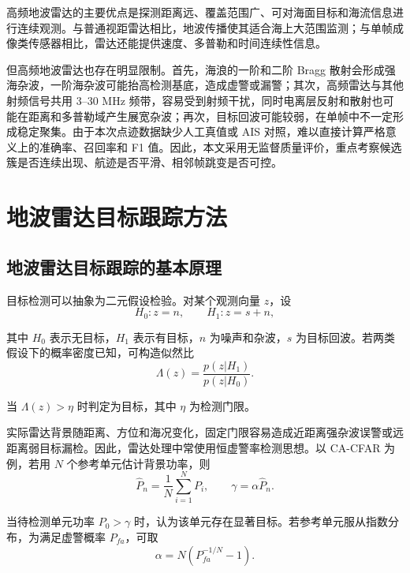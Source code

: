 \documentclass[UTF8,a4paper,12pt]{ctexart}
\numberwithin{figure}{section}
\numberwithin{table}{section}
\begin{document}
高频地波雷达的主要优点是探测距离远、覆盖范围广、可对海面目标和海流信息进行连续观测。与普通视距雷达相比，地波传播使其适合海上大范围监测；与单帧成像类传感器相比，雷达还能提供速度、多普勒和时间连续性信息。

但高频地波雷达也存在明显限制。首先，海浪的一阶和二阶 Bragg 散射会形成强海杂波，一阶海杂波可能抬高检测基底，造成虚警或漏警；其次，高频雷达与其他射频信号共用 3--30 MHz 频带，容易受到射频干扰，同时电离层反射和散射也可能在距离和多普勒域产生展宽杂波；再次，目标回波可能较弱，在单帧中不一定形成稳定聚集。由于本次点迹数据缺少人工真值或 AIS 对照，难以直接计算严格意义上的准确率、召回率和 F1 值。因此，本文采用无监督质量评价，重点考察候选簇是否连续出现、航迹是否平滑、相邻帧跳变是否可控。

\section{地波雷达目标跟踪方法}

\subsection{地波雷达目标跟踪的基本原理}

目标检测可以抽象为二元假设检验。对某个观测向量 \(z\)，设
\begin{equation}
  H_0: z=n,\qquad H_1:z=s+n,
  \label{eq:hypothesis}
\end{equation}

其中 \(H_0\) 表示无目标，\(H_1\) 表示有目标，\(n\) 为噪声和杂波，\(s\) 为目标回波。若两类假设下的概率密度已知，可构造似然比
\begin{equation}
  \Lambda(z)=\frac{p(z|H_1)}{p(z|H_0)}.
  \label{eq:likelihood}
\end{equation}

当 \(\Lambda(z)>\eta\) 时判定为目标，其中 \(\eta\) 为检测门限。

实际雷达背景随距离、方位和海况变化，固定门限容易造成近距离强杂波误警或远距离弱目标漏检。因此，雷达处理中常使用恒虚警率检测思想。以 CA-CFAR 为例，若用 \(N\) 个参考单元估计背景功率，则
\begin{equation}
  \hat{P}_n = \frac{1}{N}\sum_{i=1}^{N}P_i,
  \qquad
  \gamma = \alpha\hat{P}_n.
  \label{eq:cfar}
\end{equation}

当待检测单元功率 \(P_0>\gamma\) 时，认为该单元存在显著目标。若参考单元服从指数分布，为满足虚警概率 \(P_{fa}\)，可取
\begin{equation}
  \alpha = N\left(P_{fa}^{-1/N}-1\right).
  \label{eq:cfar_alpha}
\end{equation}
\end{document}

